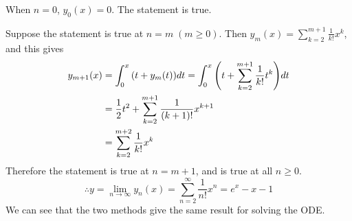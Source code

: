 \documentclass[10pt]{article}
\begin{document}
When $n = 0$, $y_0(x) = 0$. The statement is true.

Suppose the statement is true at $n=m \; (m \geq 0)$. Then $\displaystyle y_m(x) = \sum_{k=2}^{m+1}\frac{1}{k!}x^k$, and this gives
\begin{align*}
    y_{m+1}(x) &= \int_0^x\qty(t + y_{m}(t))dt = \int_0^x\qty(t + \sum_{k=2}^{m+1}\frac{1}{k!}t^k)dt \\
    &= \frac{1}{2}t^2 + \sum_{k=2}^{m+1}\frac{1}{(k+1)!}x^{k+1} \\
    &= \sum_{k=2}^{m+2}\frac{1}{k!}x^k
\end{align*}
Therefore the statement is true at $n = m+1$, and is true at all $n \geq 0$.
$$\therefore y = \lim_{n\to\infty}y_n(x) = \sum_{n=2}^{\infty}\frac{1}{n!}x^n = e^x - x - 1$$
We can see that the two methods give the same result for solving the ODE.
\end{document}
